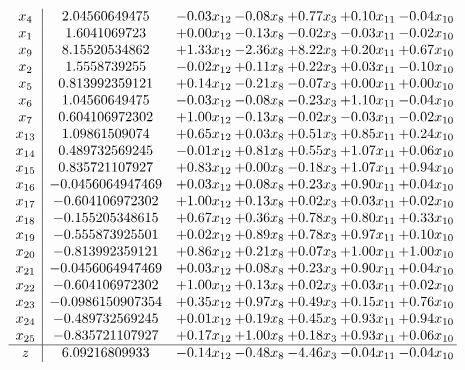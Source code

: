 \documentclass[8pt]{article}
\begin{document}
\[\begin{array}{c| c c@{\hskip 2pt} c@{\hskip 2pt} c@{\hskip 2pt} c@{\hskip 2pt} c@{\hskip 2pt} }
 x_{4}   &  2.04560649475 & -0.03 x_{12} & -0.08 x_{8} & +  0.77 x_{3} & +  0.10 x_{11} & -0.04 x_{10}\\
 x_{1}   &  1.6041069723 & +  0.00 x_{12} & -0.13 x_{8} & -0.02 x_{3} & -0.03 x_{11} & -0.02 x_{10}\\
 x_{9}   &  8.15520534862 & +  1.33 x_{12} & -2.36 x_{8} & +  8.22 x_{3} & +  0.20 x_{11} & +  0.67 x_{10}\\
 x_{2}   &  1.5558739255 & -0.02 x_{12} & +  0.11 x_{8} & +  0.22 x_{3} & +  0.03 x_{11} & -0.10 x_{10}\\
 x_{5}   &  0.813992359121 & +  0.14 x_{12} & -0.21 x_{8} & -0.07 x_{3} & +  0.00 x_{11} & +  0.00 x_{10}\\
 x_{6}   &  1.04560649475 & -0.03 x_{12} & -0.08 x_{8} & -0.23 x_{3} & +  1.10 x_{11} & -0.04 x_{10}\\
 x_{7}   &  0.604106972302 & +  1.00 x_{12} & -0.13 x_{8} & -0.02 x_{3} & -0.03 x_{11} & -0.02 x_{10}\\
 x_{13}   &  1.09861509074 & +  0.65 x_{12} & +  0.03 x_{8} & +  0.51 x_{3} & +  0.85 x_{11} & +  0.24 x_{10}\\
 x_{14}   &  0.489732569245 & -0.01 x_{12} & +  0.81 x_{8} & +  0.55 x_{3} & +  1.07 x_{11} & +  0.06 x_{10}\\
 x_{15}   &  0.835721107927 & +  0.83 x_{12} & +  0.00 x_{8} & -0.18 x_{3} & +  1.07 x_{11} & +  0.94 x_{10}\\
 x_{16}   &  -0.0456064947469 & +  0.03 x_{12} & +  0.08 x_{8} & +  0.23 x_{3} & +  0.90 x_{11} & +  0.04 x_{10}\\
 x_{17}   &  -0.604106972302 & +  1.00 x_{12} & +  0.13 x_{8} & +  0.02 x_{3} & +  0.03 x_{11} & +  0.02 x_{10}\\
 x_{18}   &  -0.155205348615 & +  0.67 x_{12} & +  0.36 x_{8} & +  0.78 x_{3} & +  0.80 x_{11} & +  0.33 x_{10}\\
 x_{19}   &  -0.555873925501 & +  0.02 x_{12} & +  0.89 x_{8} & +  0.78 x_{3} & +  0.97 x_{11} & +  0.10 x_{10}\\
 x_{20}   &  -0.813992359121 & +  0.86 x_{12} & +  0.21 x_{8} & +  0.07 x_{3} & +  1.00 x_{11} & +  1.00 x_{10}\\
 x_{21}   &  -0.0456064947469 & +  0.03 x_{12} & +  0.08 x_{8} & +  0.23 x_{3} & +  0.90 x_{11} & +  0.04 x_{10}\\
 x_{22}   &  -0.604106972302 & +  1.00 x_{12} & +  0.13 x_{8} & +  0.02 x_{3} & +  0.03 x_{11} & +  0.02 x_{10}\\
 x_{23}   &  -0.0986150907354 & +  0.35 x_{12} & +  0.97 x_{8} & +  0.49 x_{3} & +  0.15 x_{11} & +  0.76 x_{10}\\
 x_{24}   &  -0.489732569245 & +  0.01 x_{12} & +  0.19 x_{8} & +  0.45 x_{3} & +  0.93 x_{11} & +  0.94 x_{10}\\
 x_{25}   &  -0.835721107927 & +  0.17 x_{12} & +  1.00 x_{8} & +  0.18 x_{3} & +  0.93 x_{11} & +  0.06 x_{10}\\
\hline
z    &  6.09216809933 & -0.14 x_{12} & -0.48 x_{8} & -4.46 x_{3} & -0.04 x_{11} & -0.04 x_{10}\\
\end{array}\]
\end{document}
